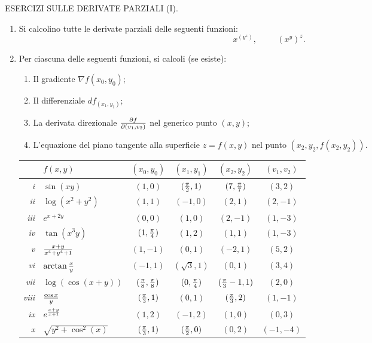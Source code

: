 
\centerline{\Large ESERCIZI SULLE DERIVATE PARZIALI (I).}
\bigskip\bigskip

\begin{enumerate}
\item Si calcolino tutte le derivate parziali delle seguenti funzioni:
$$x^{(y^z)}, \hspace{1cm}(x^y)^z.$$
\item Per ciascuna delle seguenti funzioni, si calcoli (se esiste):
\begin{enumerate}
\item Il gradiente $\nabla f(x_0,y_0)$;
\item Il differenziale $df_{(x_1,y_1)}$;
\item La derivata direzionale ${\partial f\over \partial (v_1,v_2)}$ nel 
generico punto $(x,y)$;
\item L'equazione del piano tangente alla superficie $z=f(x,y)$ nel punto 
$(x_2,y_2,f(x_2,y_2))$.
\end{enumerate}
\begin{center}
\begin{tabular}{|r|l|c|c|c|c|}
\hline
& $f(x,y)$ & $(x_0,y_0)$ & $(x_1,y_1)$ & $(x_2,y_2)$ & $(v_1,v_2)$\\ 
\hline
\hline
{\it i} &$\sin(xy)$ & $(1,0)$ & $({\pi\over2},1)$ & $(7,{\pi\over 7})$ & $(3,2)$ \\
\hline
{\it ii} &$\log(x^2+y^2)$ & $(1,1)$ & $(-1,0)$ & $(2,1)$ & $(2,-1)$\\
\hline
{\it iii} &$e^{x+2y}$ & $(0,0)$ & $(1,0)$& $(2,-1)$& $(1,-3)$\\
\hline
{\it iv} &$\tan(x^3y)$ & $(1,{\pi\over 4})$ & $(1,2)$ & $(1,1)$ & $(1,-3)$\\
\hline
{\it v} &${x+y\over x^4+y^4+1}$ & $(1,-1)$& $(0,1)$& $(-2,1)$& $(5,2)$\\
\hline
{\it vi} &$\arctan{x\over y}$& $(-1,1)$& $(\sqrt{3},1)$& $(0,1)$& $(3,4)$\\
\hline
{\it vii} &$\log(\cos(x+y))$ & $({\pi\over 8},{\pi\over 8})$& $(0,{\pi\over4})$& $({\pi\over3}-1,1)$& $(2,0)$\\
\hline
{\it viii} &${\cos x\over y}$ & $({\pi\over3},1)$& $(0,1)$& $({\pi\over3},2)$& $(1,-1)$\\
\hline
{\it ix} &$e^{{x+y\over x+1}}$ & $(1,2)$& $(-1,2)$& $(1,0)$& $(0,3)$\\
\hline
{\it x} &$\sqrt{y^2+\cos^2(x)}$& $({\pi\over3},1)$& $({\pi\over2},0)$& $(0,2)$& $(-1,-4)$\\

\end{tabular}
\end{center}
\end{enumerate}
